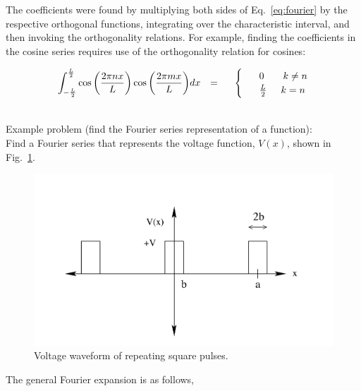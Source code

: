 \documentclass[12pt]{article}
\begin{document}
\begin{flushleft}
The coefficients were found by multiplying both sides of Eq.~\ref{eq:fourier} by the respective orthogonal functions, integrating over the characteristic interval, and then invoking the orthogonality relations.  For example, finding the coefficients in the cosine series requires use of the orthogonality relation for cosines:

\begin{equation*}
\int_{-\frac{L}{2}}^{\frac{L}{2}} \cos{\left( \frac{2\pi n x}{L} \right)} \cos{\left( \frac{2\pi m x}{L} \right)} dx \hspace{.1in} = \hspace{.2in}
\begin{cases}
 & \hspace{.1in} 0 \hspace{.27in}  k \neq n \\
 & \hspace{.1in} \frac{L}{2}  \hspace{.2in}  k=n
\end{cases}
\label{eq:sinusoidal_orthogonality}
\end{equation*}

\vspace{.1in}
{\color{grey} \hrulefill}\\
{\color{mygreen} Example problem (find the Fourier series representation of a function):}\\

Find a Fourier series that represents the voltage function, $V(x)$, shown in Fig.~\ref{fig:sqpulses}.
\begin{figure}[h]
\centering
\includegraphics*[trim=0cm 0cm 0cm 0cm, clip=true, width=0.7\columnwidth]{sqpulses.png}
\caption{\small Voltage waveform of repeating square pulses.}
\label{fig:sqpulses}
\end{figure}

The general Fourier expansion is as follows,


\end{flushleft}
\end{document}
